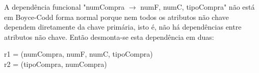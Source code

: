 \documentclass[12pt]{article}
\begin{document}
\begin{titlepage}
A dependência funcional "numCompra $\longrightarrow$ numF, numC, tipoCompra"  não está em Boyce-Codd forma normal porque nem todos os atributos não chave dependem diretamente da chave primária, isto é, não há dependências entre atributos não chave. Então desmonta-se esta dependência em duas:
\begin{center}
r1 = (numCompra, numF, numC, tipoCompra)\\
r2 = (tipoCompra, numCompra)
\end{center}
\end{titlepage}
\end{document}
